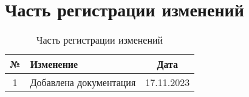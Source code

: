 \documentclass{article}
\begin{document}
\section{Часть регистрации изменений}

\begin{table}[h]
  \centering
  \caption{Часть регистрации изменений}
  \begin{tabular}{|c|p{8cm}|c|}
    \hline
    \textbf{№} & \textbf{Изменение}     & \textbf{Дата} \\
    \hline
    1          & Добавлена документация & 17.11.2023    \\
    \hline
  \end{tabular}
\end{table}
\end{document}
